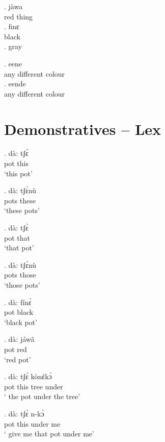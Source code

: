 \documentclass{assets/fieldnotes}
\begin{document}
\exg.  jàwa\\
red thing\\

\exg. finɛ\\
black\\


\ex. gray\\

\ex. {\textltailn}e{\textltailn}ene\\
any different colour\\

\ex. {\textltailn}e{\textltailn}ende\\
any different colour\\


\section{Demonstratives -- Lex} 
\exg. dà: tʃɛ̀\\
 pot this\\
`this pot'

\exg. dà: tʃɛ̀nù\\
 pots these\\
`these pots'


\exg. dà: tʃɛ̀ \\
 pot that\\
`that pot'


\exg. dà: tʃɛ̀nù \\
 pots those\\
`those pots'


\exg. dà: fínɛ̀\\
 pot black\\
`black pot'

\exg. dà: jáwâ\\
 pot red\\
`red pot'

\exg. dà: tʃɛ̀ kònέkɔ̀\\
  pot this tree under\\
` the pot under the tree'

\exg. dà: tʃɛ̀ n-kɔ̀\\
 pot this under me\\
` give me that pot under me'
\end{document}
